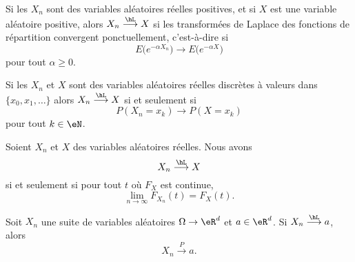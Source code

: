 \begin{proposition}		\label{PROPooNRQJooXoCcbZ}
	Si les \( X_n\) sont des variables aléatoires réelles positives, et si \( X\) est une variable aléatoire positive, alors \( X_n\stackrel{\hL}{\longrightarrow}X\) si les transformées de Laplace des fonctions de répartition convergent ponctuellement, c'est-à-dire si
	\begin{equation}
		E\big(  e^{-\alpha X_n} \big)\to E\big(  e^{-\alpha X} \big)
	\end{equation}
	pour tout \( \alpha\geq 0\).
\end{proposition}

\begin{proposition}		\label{PROPooZMHKooLwCwqs}
	Si les \( X_n\) et \( X\) sont des variables aléatoires réelles discrètes à valeurs dans \( \{ x_0,x_1,\ldots \}\) alors \( X_n\stackrel{\hL}{\longrightarrow} X\) si et seulement si
	\begin{equation}
		P(X_n=x_k)\to P(X=x_k)
	\end{equation}
	pour tout \( k\in\eN\).
\end{proposition}

\begin{proposition}     \label{PropXncvXFXcvFxt}
	Soient \( X_n\) et \( X\) des variables aléatoires réelles. Nous avons
	\begin{equation}
		X_n\stackrel{\hL}{\longrightarrow}X
	\end{equation}
	si et seulement si pour tout \( t\) où \( F_X\) est continue,
	\begin{equation}
		\lim_{n\to \infty} F_{X_n}(t)=F_X(t).
	\end{equation}
\end{proposition}

\begin{proposition}     \label{PropCvLfcvPsicst}
	Soit \( X_n\) une suite de variables aléatoires \( \Omega\to \eR^d\) et \( a\in\eR^d\). Si \( X_n\stackrel{\hL}{\longrightarrow}a\), alors
	\begin{equation}
		X_n\stackrel{P}{\longrightarrow}a.
	\end{equation}
\end{proposition}

